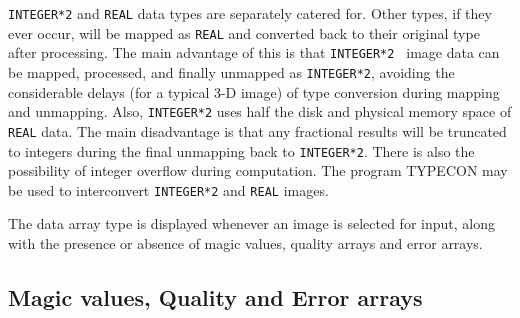 {\tt INTEGER*2} and {\tt REAL} data types are separately catered for. Other 
types, if they ever occur, will be mapped as {\tt REAL} and converted back
to their original type after processing. The main advantage of this is that 
{\tt INTEGER*2 } image data can be mapped, processed, and finally unmapped as 
{\tt INTEGER*2}, avoiding the considerable delays (for a typical 3-D image) of 
type conversion during mapping and unmapping. Also, {\tt INTEGER*2} uses 
half the disk and physical memory space of {\tt REAL} data. The main 
disadvantage is that any fractional results will be truncated to integers
during the final unmapping back to {\tt INTEGER*2}. There is also the 
possibility of integer overflow during computation. The program 
TYPECON may be used to interconvert {\tt INTEGER*2} and {\tt REAL} images.

The data array type is displayed whenever an image is selected for input,
along with the presence or absence of magic values, quality arrays and error
arrays.

\subsection{Magic values, Quality and Error arrays}

